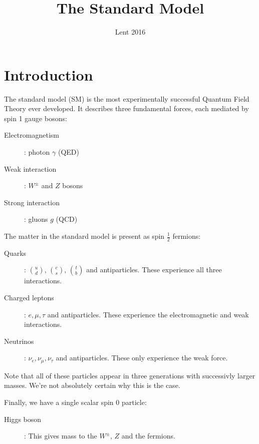 \documentclass{jknotes}
\begin{document}
\title{The Standard Model}
\date{Lent 2016}

\maketitle
\suggestionsspiel
\tableofcontents

\section{Introduction}
The standard model (SM) is the most experimentally successful Quantum Field Theory ever developed. It describes three fundamental forces, each mediated by spin 1 gauge bosons:
\begin{description}
    \item[Electromagnetism]: photon \(\gamma\) (QED)
    \item[Weak interaction]: \(W^\pm\) and \(Z\) bosons
    \item[Strong interaction]: gluons \(g\) (QCD)
\end{description}
The matter in the standard model is present as spin \(\frac{1}{2}\) fermions:
\begin{description}
    \item[Quarks]: \(u\choose d\), \(c\choose s\), \(t\choose b\) and antiparticles. These experience all three interactions.
    \item[Charged leptons]: \(e,\mu,\tau\) and antiparticles. These experience the electromagnetic and weak interactions.
    \item[Neutrinos]: \(\nu_e,\nu_\mu,\nu_\tau\) and antiparticles. These only experience the weak force.
\end{description}
Note that all of these particles appear in three generations with successivly larger masses. We're not absolutely certain why this is the case.

Finally, we have a single scalar spin 0 particle:
\begin{description}
    \item[Higgs boson]: This gives mass to the \(W^\pm\), \(Z\) and the fermions.
\end{description}
\end{document}
